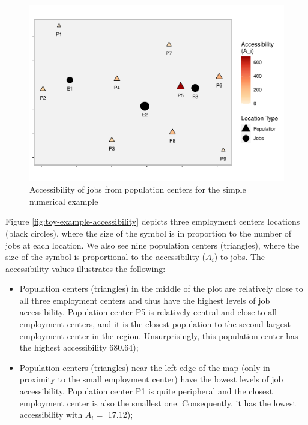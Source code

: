 \documentclass[]{elsarticle} %
\begin{document}
\begin{figure}
\includegraphics[width=1\linewidth]{Spatial-Availability_files/figure-latex/toy-example-accessibility-plot-1} \caption{\label{fig:toy-example-accessibility}Accessibility of jobs from population centers for the simple numerical example}\label{fig:toy-example-accessibility-plot}
\end{figure}

Figure \ref{fig:toy-example-accessibility} depicts three employment
centers locations (black circles), where the size of the symbol is in
proportion to the number of jobs at each location. We also see nine
population centers (triangles), where the size of the symbol is
proportional to the accessibility (\(A_i\)) to jobs. The accessibility
values illustrates the following:

\begin{itemize}
\item
  Population centers (triangles) in the middle of the plot are
  relatively close to all three employment centers and thus have the
  highest levels of job accessibility. Population center P5 is
  relatively central and close to all employment centers, and it is the
  closest population to the second largest employment center in the
  region. Unsurprisingly, this population center has the highest
  accessibility 680.64);
\item
  Population centers (triangles) near the left edge of the map (only in
  proximity to the small employment center) have the lowest levels of
  job accessibility. Population center P1 is quite peripheral and the
  closest employment center is also the smallest one. Consequently, it
  has the lowest accessibility with \(A_i=\) 17.12);
\end{itemize}
\end{document}
